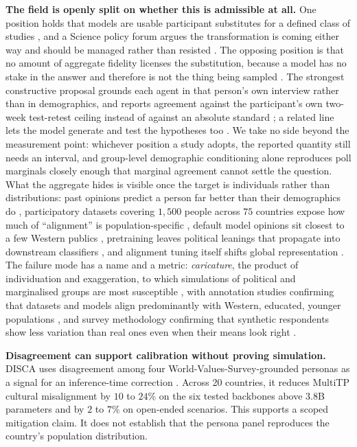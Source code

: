 \documentclass[11pt]{article}
\begin{document}
\textbf{The field is openly split on whether this is admissible at all.} One
position holds that models are usable participant substitutes for a defined
class of studies \cite{dillion2023replace}, and a Science policy forum argues
the transformation is coming either way and should be managed rather than
resisted \cite{grossmann2023transformation}. The opposing position is that no
amount of aggregate fidelity licenses the substitution, because a model has no
stake in the answer and therefore is not the thing being sampled
\cite{harding2024cannot}. The strongest constructive proposal grounds each
agent in that person's own interview rather than in demographics, and reports
agreement against the participant's own two-week test-retest ceiling instead of
against an absolute standard \cite{park2024selfreports}; a related line lets
the model generate and test the hypotheses too \cite{manning2024automated}. We
take no side beyond the measurement point: whichever position a study adopts,
the reported quantity still needs an interval, and group-level demographic
conditioning alone reproduces poll marginals closely enough
\cite{sun2024random} that marginal agreement cannot settle the question. What
the aggregate hides is visible once the target is individuals rather than
distributions: past opinions predict a person far better than their
demographics do \cite{hwang2023aligning}, participatory datasets covering
$1{,}500$ people across $75$ countries expose how much of ``alignment'' is
population-specific \cite{kirk2024prism}, default model opinions sit closest to
a few Western publics \cite{durmus2023global}, pretraining leaves political
leanings that propagate into downstream classifiers
\cite{feng2023pretraining}, and alignment tuning itself shifts global
representation \cite{ryan2024unintended}. The failure mode has a name and a
metric: \emph{caricature}, the product of individuation and exaggeration, to
which simulations of political and marginalised groups are most susceptible
\cite{cheng2023compost,cheng2023marked}, with annotation studies confirming
that datasets and models align predominantly with Western, educated,
younger populations \cite{santy2023nlpositionality,naous2024beer}, and survey
methodology confirming that synthetic respondents show less variation than
real ones even when their means look right \cite{bisbee2024synthetic}.

\textbf{Disagreement can support calibration without proving simulation.}
DISCA uses disagreement among four World-Values-Survey-grounded personas as a
signal for an inference-time correction \cite{huynh2026disca}. Across 20
countries, it reduces MultiTP cultural misalignment by $10$ to $24\%$ on the six
tested backbones above 3.8B parameters and by $2$ to $7\%$ on open-ended
scenarios. This supports a scoped mitigation claim. It does not establish that
the persona panel reproduces the country's population distribution.
\end{document}
